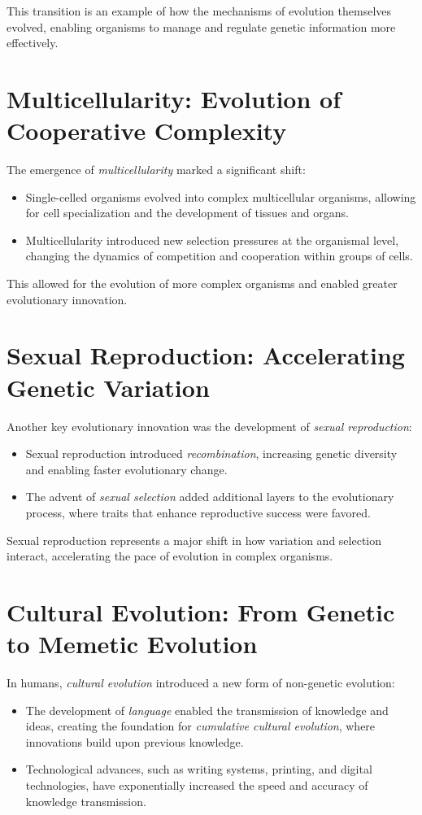 \documentclass[10pt,titlepage]{book}
\begin{document}
This transition is an example of how the mechanisms of evolution themselves evolved, enabling organisms to manage and regulate genetic information more effectively.

\section{Multicellularity: Evolution of Cooperative Complexity}

The emergence of \textit{multicellularity} marked a significant shift:
\begin{itemize}
    \item Single-celled organisms evolved into complex multicellular organisms, allowing for cell specialization and the development of tissues and organs.
    \item Multicellularity introduced new selection pressures at the organismal level, changing the dynamics of competition and cooperation within groups of cells.
\end{itemize}

This allowed for the evolution of more complex organisms and enabled greater evolutionary innovation.

\section{Sexual Reproduction: Accelerating Genetic Variation}

Another key evolutionary innovation was the development of \textit{sexual reproduction}:
\begin{itemize}
    \item Sexual reproduction introduced \textit{recombination}, increasing genetic diversity and enabling faster evolutionary change.
    \item The advent of \textit{sexual selection} added additional layers to the evolutionary process, where traits that enhance reproductive success were favored.
\end{itemize}

Sexual reproduction represents a major shift in how variation and selection interact, accelerating the pace of evolution in complex organisms.

\section{Cultural Evolution: From Genetic to Memetic Evolution}

In humans, \textit{cultural evolution} introduced a new form of non-genetic evolution:
\begin{itemize}
    \item The development of \textit{language} enabled the transmission of knowledge and ideas, creating the foundation for \textit{cumulative cultural evolution}, where innovations build upon previous knowledge.
    \item Technological advances, such as writing systems, printing, and digital technologies, have exponentially increased the speed and accuracy of knowledge transmission.
\end{itemize}
\end{document}
